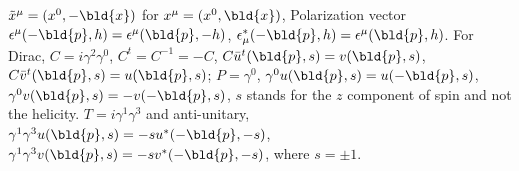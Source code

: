 $\tilde{x}^\mu = (x^0, -\bld{x})$ for $x^\mu = (x^0, \bld{x})$,
Polarization vector $\epsilon^\mu(-\bld{p}, h ) = \epsilon^\mu(\bld{p}, -h )$,
$\epsilon_\mu^*(-\bld{p}, h ) = \epsilon^\mu(\bld{p}, h )$.
For Dirac, $C = i \gamma^2 \gamma^0$, $C^t = C^{-1} = - C$,
$C\bar{u}^t (\bld{p}, s) = v(\bld{p}, s)$, $C\bar{v}^t (\bld{p}, s) = u(\bld{p}, s)$;
$P = \gamma^0$, $\gamma^0 u(\bld{p}, s) = u(-\bld{p}, s)$,
$\gamma^0 v(\bld{p}, s) = -v(-\bld{p}, s)$,
$s$ stands for the $z$ component of spin and not the helicity.
$T = i \gamma^1 \gamma^3$ and anti-unitary,
$\gamma^1 \gamma^3 u(\bld{p}, s) = -s u^*(-\bld{p}, -s)$,
$\gamma^1 \gamma^3 v(\bld{p}, s) = -s v^*(-\bld{p}, -s)$,
where $s = \pm 1$.
